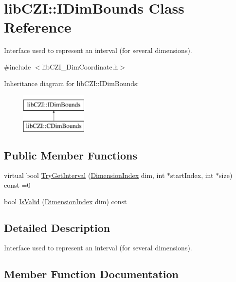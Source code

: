 \hypertarget{classlib_c_z_i_1_1_i_dim_bounds}{}\section{lib\+C\+ZI\+:\+:I\+Dim\+Bounds Class Reference}
\label{classlib_c_z_i_1_1_i_dim_bounds}


Interface used to represent an interval (for several dimensions).  




{\ttfamily \#include $<$lib\+C\+Z\+I\+\_\+\+Dim\+Coordinate.\+h$>$}

Inheritance diagram for lib\+C\+ZI\+:\+:I\+Dim\+Bounds\+:\begin{figure}[H]
\begin{center}
\leavevmode
\includegraphics[height=2.000000cm]{classlib_c_z_i_1_1_i_dim_bounds}
\end{center}
\end{figure}
\subsection*{Public Member Functions}
\begin{DoxyCompactItemize}
\item 
virtual bool \hyperlink{classlib_c_z_i_1_1_i_dim_bounds_a7f42cf193370731a6b21ae5d2d6fa78e}{Try\+Get\+Interval} (\hyperlink{namespacelib_c_z_i_a55049658acf59d0eddfaebcad16df424}{Dimension\+Index} dim, int $\ast$start\+Index, int $\ast$size) const =0
\item 
bool \hyperlink{classlib_c_z_i_1_1_i_dim_bounds_ae34c55b6b510804b86383eea5b7c0da9}{Is\+Valid} (\hyperlink{namespacelib_c_z_i_a55049658acf59d0eddfaebcad16df424}{Dimension\+Index} dim) const
\end{DoxyCompactItemize}


\subsection{Detailed Description}
Interface used to represent an interval (for several dimensions). 

\subsection{Member Function Documentation}
\mbox{\label{classlib_c_z_i_1_1_i_dim_bounds_ae34c55b6b510804b86383eea5b7c0da9}} 
